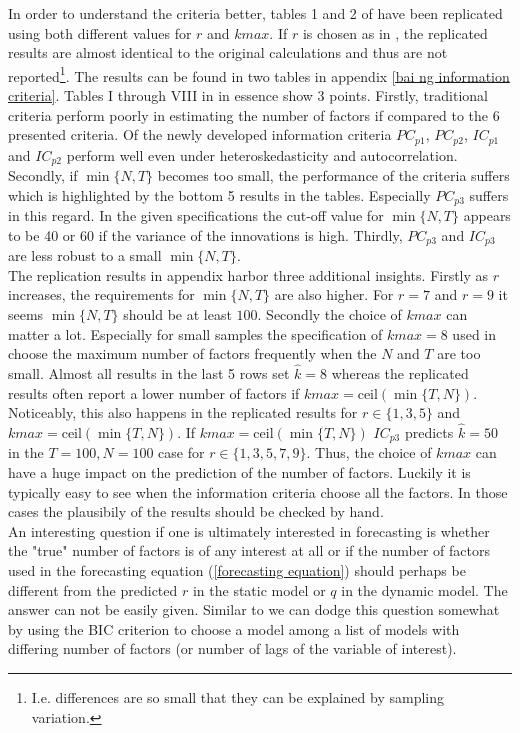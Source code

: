 \documentclass[11pt]{article}
\begin{document}
In order to understand the criteria better, tables 1 and 2 of \citet{bai2002determining} have been replicated using both different values for $r$ and $kmax$. If $r$ is chosen as in \citet{bai2002determining}, the replicated results are almost identical to the original calculations and thus are not reported\footnote{I.e. differences are so small that they can be explained by sampling variation.}. The results can be found in two tables in appendix \ref{bai ng information criteria}. Tables I through VIII in \citet{bai2002determining} in essence show $3$ points. Firstly, traditional criteria perform poorly in estimating the number of factors if compared to the $6$ presented criteria. Of the newly developed information criteria $PC_{p1}$, $PC_{p2}$, $IC_{p1}$ and $IC_{p2}$ perform well even under heteroskedasticity and autocorrelation. Secondly, if $\min\{N, T\}$ becomes too small, the performance of the criteria suffers which is highlighted by the bottom 5 results in the tables. Especially $PC_{p3}$ suffers in this regard. In the given specifications the cut-off value for $\min\{N, T\}$ appears to be 40 or 60 if the variance of the innovations is high. Thirdly, $PC_{p3}$ and $IC_{p3}$ are less robust to a small $\min\{N, T\}$. \\
The replication results in appendix \citet{bai2002determining} harbor three additional insights. Firstly as $r$ increases, the requirements for $\min\{N, T\}$ are also higher. For $r=7$ and $r=9$ it seems $\min\{N, T\}$ should be at least $100$. Secondly the choice of $kmax$ can matter a lot. Especially for small samples the specification of $kmax=8$ used in \citet{bai2002determining} choose the maximum number of factors frequently when the $N$ and $T$ are too small. Almost all results in the last 5 rows set $\hat k=8$ whereas the replicated results often report a lower number of factors if $kmax=\text{ceil}(\min\{T, N\})$. Noticeably, this also happens in the replicated results for $r \in \{1, 3, 5\}$ and $kmax=\text{ceil}(\min\{T, N\})$. If $kmax=\text{ceil}(\min\{T, N\})$ $IC_{p3}$ predicts $\hat k=50$ in the $T=100, N=100$ case for $r \in \{1, 3, 5, 7, 9\}$. Thus, the choice of $kmax$ can have a huge impact on the prediction of the number of factors. Luckily it is typically easy to see when the information criteria choose all the factors. In those cases the plausibily of the results should be checked by hand. \\

An interesting question if one is ultimately interested in forecasting is whether the "true" number of factors is of any interest at all or if the number of factors used in the forecasting equation (\ref{forecasting equation}) should perhaps be different from the predicted $r$ in the static model or $q$ in the dynamic model. The answer can not be easily given. Similar to \citet{bai2008forecasting} we can dodge this question somewhat by using the BIC criterion to choose a model among a list of models with differing number of factors (or number of lags of the variable of interest).
\end{document}
